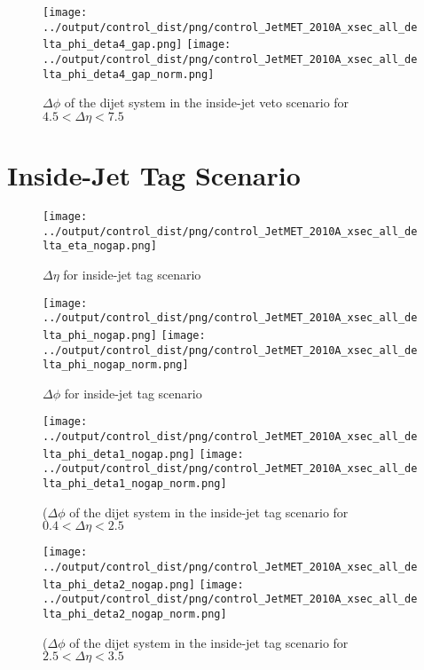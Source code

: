 \documentclass[11pt]{article}
\begin{document}
\begin{figure}[ht]
\centering
\texttt{[image: ../output/control\_dist/png/control\_JetMET\_2010A\_xsec\_all\_delta\_phi\_deta4\_gap.png]}
\texttt{[image: ../output/control\_dist/png/control\_JetMET\_2010A\_xsec\_all\_delta\_phi\_deta4\_gap\_norm.png]}
\caption{$\Delta\phi$ of the dijet system in the inside-jet veto scenario for $4.5 < \Delta\eta < 7.5$}
\label{fig:delta_gap_deta4}
\end{figure}

\clearpage


\section{Inside-Jet Tag Scenario}

\begin{figure}[ht]
\centering
\texttt{[image: ../output/control\_dist/png/control\_JetMET\_2010A\_xsec\_all\_delta\_eta\_nogap.png]}
\caption{$\Delta\eta$ for inside-jet tag scenario}
\label{fig:delta_eta_nogap}
\end{figure}

\begin{figure}[ht]
\centering
\texttt{[image: ../output/control\_dist/png/control\_JetMET\_2010A\_xsec\_all\_delta\_phi\_nogap.png]}
\texttt{[image: ../output/control\_dist/png/control\_JetMET\_2010A\_xsec\_all\_delta\_phi\_nogap\_norm.png]}
\caption{$\Delta\phi$ for inside-jet tag scenario}
\label{fig:delta_phi_nogap}
\end{figure}


\begin{figure}[ht]
\centering
\texttt{[image: ../output/control\_dist/png/control\_JetMET\_2010A\_xsec\_all\_delta\_phi\_deta1\_nogap.png]}
\texttt{[image: ../output/control\_dist/png/control\_JetMET\_2010A\_xsec\_all\_delta\_phi\_deta1\_nogap\_norm.png]}
\caption{($\Delta\phi$ of the dijet system in the inside-jet tag scenario for $0.4 < \Delta\eta < 2.5$}
\label{fig:delta_nogap_deta1}
\end{figure}

\begin{figure}[ht]
\centering
\texttt{[image: ../output/control\_dist/png/control\_JetMET\_2010A\_xsec\_all\_delta\_phi\_deta2\_nogap.png]}
\texttt{[image: ../output/control\_dist/png/control\_JetMET\_2010A\_xsec\_all\_delta\_phi\_deta2\_nogap\_norm.png]}
\caption{($\Delta\phi$ of the dijet system in the inside-jet tag scenario for $2.5 < \Delta\eta < 3.5$}
\label{fig:delta_nogap_deta2}
\end{figure}
\end{document}
